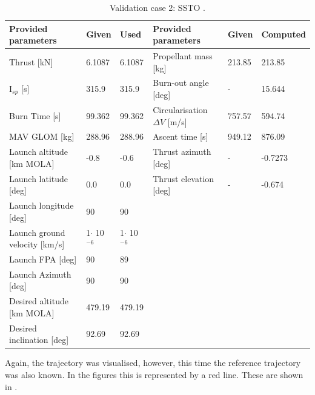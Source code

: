 \begin{table}[H]
\begin{center}
\caption{Validation case 2: \ac{SSTO} \cite{benito2016trajectory}.}
\label{tab:validationCaseBenito}
\begin{tabular}{|l|l|l||l||l|l|}
\hline 
\textbf{Provided parameters} & \textbf{Given} & \textbf{Used} & \textbf{Provided parameters} & \textbf{Given} & \textbf{Computed} \\ \hline \hline
Thrust [kN] & 6.1087 & 6.1087 & Propellant mass [kg] & 213.85 & 213.85 \\ \hline
I$_{sp}$ [s] & 315.9 & 315.9 & Burn-out angle [deg] & - & 15.644 \\ \hline
Burn Time [s] & 99.362 & 99.362 & Circularisation $\Delta V$ [m/s] & 757.57 & 594.74 \\ \hline
\ac{MAV} \ac{GLOM} [kg] & 288.96 & 288.96 & Ascent time [s] & 949.12 & 876.09 \\ \hline
Launch altitude [km \ac{MOLA}] & -0.8 & -0.6 & Thrust azimuth [deg] & - & -0.7273 \\ \hline
Launch latitude [deg] & 0.0 & 0.0 & Thrust elevation [deg] & - & -0.674 \\ \hline
Launch longitude [deg] & 90 & 90 & & & \\ \hline
Launch ground velocity [km/s] & 1$\cdot $ 10$^{-6}$ & 1$\cdot $ 10$^{-6}$ & & & \\ \hline
Launch \ac{FPA} [deg] & 90 & 89 & & & \\ \hline
Launch Azimuth [deg] & 90 & 90 & & & \\ \hline
Desired altitude [km \ac{MOLA}] & 479.19 & 479.19 & & & \\ \hline
Desired inclination [deg] & 92.69 & 92.69 & & & \\ \hline




\end{tabular}
\end{center}
\end{table}

\noindent
Again, the trajectory was visualised, however, this time the reference trajectory was also known. In the figures this is represented by a red line. These are shown in .




